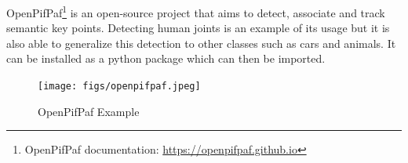 OpenPifPaf\cite{Kreiss2021,Kreiss2019}\footnote{OpenPifPaf documentation: \url{https://openpifpaf.github.io}} is an open-source project that aims to detect, associate and track semantic key points. Detecting human joints is an example of its usage but it is also able to generalize this detection to other classes such as cars and animals. It can be installed as a python package which can then be imported.

\begin{figure}[h]
\centerline{\texttt{[image: figs/openpifpaf.jpeg]}}
\caption[OpenPifPaf Example]{OpenPifPaf Example \cite{Kreiss2021}}
\label{openpifpaf}
\end{figure}